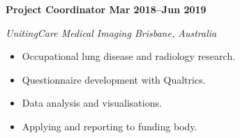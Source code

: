 \textbf{Project Coordinator \hfill Mar 2018--Jun 2019}\par
\textit{UnitingCare Medical Imaging \hfill Brisbane, Australia}\par
\begin{itemize}
    \item Occupational lung disease and radiology research.
	\item Questionnaire development with Qualtrics.
	\item Data analysis and visualisations.
    \item Applying and reporting to funding body.
\end{itemize}\par